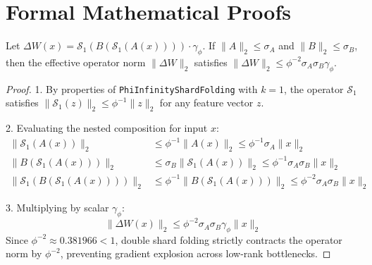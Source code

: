 \section{Formal Mathematical Proofs}

\begin{theorem}
Let $\Delta W(x) = \mathcal{S}_1(B(\mathcal{S}_1(A(x)))) \cdot \gamma_{\phi}$. If $\|A\|_2 \le \sigma_A$ and $\|B\|_2 \le \sigma_B$, then the effective operator norm $\|\Delta W\|_2$ satisfies $\|\Delta W\|_2 \le \phi^{-2} \sigma_A \sigma_B \gamma_{\phi}$.
\end{theorem}

\begin{proof}
1. By properties of \texttt{PhiInfinityShardFolding} with $k=1$, the operator $\mathcal{S}_1$ satisfies $\|\mathcal{S}_1(z)\|_2 \le \phi^{-1} \|z\|_2$ for any feature vector $z$.

2. Evaluating the nested composition for input $x$:
\begin{align}
    \|\mathcal{S}_1(A(x))\|_2 &\le \phi^{-1} \|A(x)\|_2 \le \phi^{-1} \sigma_A \|x\|_2 \\
    \|B(\mathcal{S}_1(A(x)))\|_2 &\le \sigma_B \|\mathcal{S}_1(A(x))\|_2 \le \phi^{-1} \sigma_A \sigma_B \|x\|_2 \\
    \|\mathcal{S}_1(B(\mathcal{S}_1(A(x))))\|_2 &\le \phi^{-1} \|B(\mathcal{S}_1(A(x)))\|_2 \le \phi^{-2} \sigma_A \sigma_B \|x\|_2
\end{align}

3. Multiplying by scalar $\gamma_{\phi}$:
\begin{equation}
    \|\Delta W(x)\|_2 \le \phi^{-2} \sigma_A \sigma_B \gamma_{\phi} \|x\|_2
\end{equation}
Since $\phi^{-2} \approx 0.381966 < 1$, double shard folding strictly contracts the operator norm by $\phi^{-2}$, preventing gradient explosion across low-rank bottlenecks.
\end{proof}